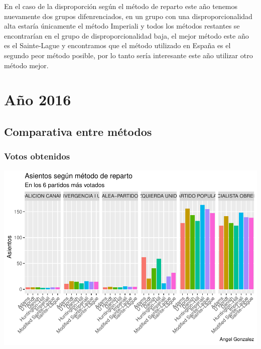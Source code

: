 \documentclass[12pt,a4paper,]{book}
\numberwithin{dummy}{section}
\theoremstyle{ocrenumbox}
\theoremstyle{blacknumex}
\theoremstyle{blacknumbox}
\theoremstyle{ocrenum}
\theoremstyle{ocrenum}
\begin{document}
En el caso de la disproporción según el método de reparto este año
tenemos nuevamente dos grupos difenrenciados, en un grupo con una
disproporcionalidad alta estaría únicamente el método Imperiali y todos
los métodos restantes se encontrarían en el grupo de disproporcionalidad
baja, el mejor método este año es el Sainte-Lague y encontramos que el
método utilizado en España es el segundo peor método posible, por lo
tanto sería interesante este año utilizar otro método mejor.

\hypertarget{auxf1o-2016}{%
\section{Año 2016}\label{auxf1o-2016}}

\hypertarget{comparativa-entre-muxe9todos-12}{%
\subsection{Comparativa entre
métodos}\label{comparativa-entre-muxe9todos-12}}

\hypertarget{votos-obtenidos-12}{%
\subsubsection{Votos obtenidos}\label{votos-obtenidos-12}}

\begin{center}\includegraphics[width=0.95\linewidth]{figurasR/unnamed-chunk-119-1} \end{center}
\end{document}
